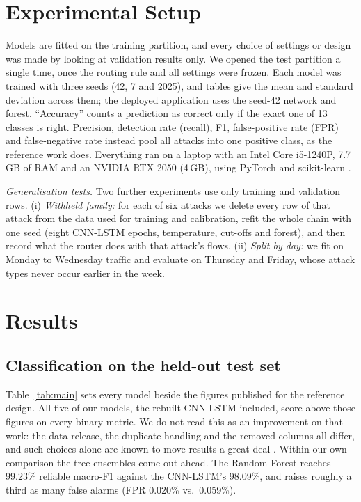 \documentclass[conference]{IEEEtran}
\begin{document}
\section{Experimental Setup}
Models are fitted on the training partition, and every choice of settings or design was made by
looking at validation results only. We opened the test partition a single time, once the routing
rule and all settings were frozen. Each model was trained with three seeds (42, 7 and 2025), and
tables give the mean and standard deviation across them; the deployed application uses the seed-42
network and forest. ``Accuracy'' counts a prediction as correct only if the exact one of 13
classes is right. Precision, detection rate (recall), F1, false-positive rate (FPR) and
false-negative rate instead pool all attacks into one positive class, as the reference work does.
Everything ran on a laptop with an Intel Core i5-1240P, 7.7\,GB of RAM and an NVIDIA RTX 2050
(4\,GB), using PyTorch \cite{paszke2019pytorch} and scikit-learn \cite{pedregosa2011scikit}.

\textit{Generalisation tests.} Two further experiments use only training and validation rows.
(i) \emph{Withheld family:} for each of six attacks we delete every row of that attack from the
data used for training and calibration, refit the whole chain with one seed (eight CNN-LSTM epochs,
temperature, cut-offs and forest), and then record what the router does with that attack's flows.
(ii) \emph{Split by day:} we fit on Monday to Wednesday traffic and evaluate on Thursday and
Friday, whose attack types never occur earlier in the week.

\section{Results}

\subsection{Classification on the held-out test set}
Table~\ref{tab:main} sets every model beside the figures published for the reference design. All
five of our models, the rebuilt CNN-LSTM included, score above those figures on every binary
metric. We do not read this as an improvement on that work: the data release, the duplicate
handling and the removed columns all differ, and such choices alone are known to move results a
great deal \cite{engelen2021troubleshooting,arp2022dos}. Within our own comparison the tree
ensembles come out ahead. The Random Forest reaches 99.23\% reliable macro-F1 against the
CNN-LSTM's 98.09\%, and raises roughly a third as many false alarms (FPR 0.020\% vs.\ 0.059\%).
\end{document}
